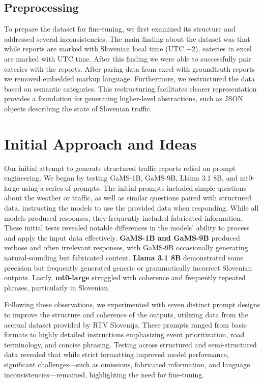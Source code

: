 \documentclass[fleqn,moreauthors,10pt]{ds_report}
\begin{document}
\subsection*{Preprocessing}

To prepare the dataset for fine-tuning, we first examined its structure and addressed several inconsistencies. The main finding about the dataset was that while reports are marked with Slovenian local time (UTC +2), eateries in excel are marked with UTC time. After this finding we were able to successfully pair eateries with the reports. After paring data from excel with groundtruth reports we removed embedded markup language. Furthermore, we restructured the data based on semantic categories. This restructuring facilitates clearer representation provides a foundation for generating higher-level abstractions, such as JSON objects describing the state of Slovenian traffic.

\section*{Initial Approach and Ideas}
Our initial attempt to generate structured traffic reports relied on prompt engineering. We began by testing GaMS-1B, GaMS-9B, Llama 3.1 8B, and mt0-large using a series of prompts. The initial prompts included simple questions about the weather or traffic, as well as similar questions paired with structured data, instructing the models to use the provided data when responding. While all models produced responses, they frequently included fabricated information. These initial tests revealed notable differences in the models' ability to process and apply the input data effectively. \textbf{GaMS-1B and GaMS-9B} produced verbose and often irrelevant responses, with GaMS-9B occasionally generating natural-sounding but fabricated content. \textbf{Llama 3.1 8B} demonstrated some precision but frequently generated generic or grammatically incorrect Slovenian outputs. Lastly, \textbf{mt0-large} struggled with coherence and frequently repeated phrases, particularly in Slovenian.

Following these observations, we experimented with seven distinct prompt designs to improve the structure and coherence of the outputs, utilizing data from the accrual dataset provided by RTV Slovenija. These prompts ranged from basic formats to highly detailed instructions emphasizing event prioritization, road terminology, and concise phrasing. Testing across structured and semi-structured data revealed that while strict formatting improved model performance, significant challenges—such as omissions, fabricated information, and language inconsistencies—remained, highlighting the need for fine-tuning.
\end{document}
